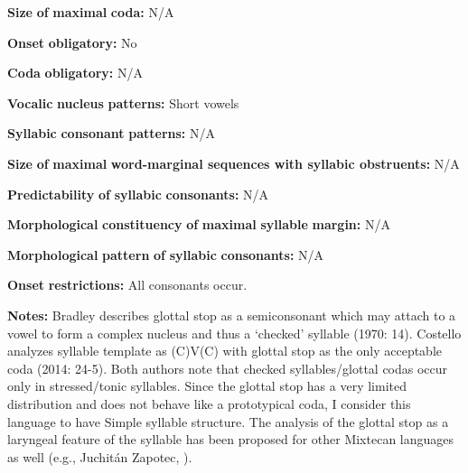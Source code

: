 \begin{styleBody}
\textbf{Size} \textbf{of} \textbf{maximal} \textbf{coda:} N/A
\end{styleBody}

\begin{styleBody}
\textbf{Onset} \textbf{obligatory:} No
\end{styleBody}

\begin{styleBody}
\textbf{Coda} \textbf{obligatory:} N/A
\end{styleBody}

\begin{styleBody}
\textbf{Vocalic} \textbf{nucleus} \textbf{patterns:} Short vowels
\end{styleBody}

\begin{styleBody}
\textbf{Syllabic} \textbf{consonant} \textbf{patterns:} N/A
\end{styleBody}

\begin{styleBody}
\textbf{Size} \textbf{of} \textbf{maximal} \textbf{word{}-marginal sequences with syllabic obstruents:} N/A
\end{styleBody}

\begin{styleBody}
\textbf{Predictability} \textbf{of} \textbf{syllabic} \textbf{consonants:} N/A
\end{styleBody}

\begin{styleBody}
\textbf{Morphological} \textbf{constituency} \textbf{of} \textbf{maximal} \textbf{syllable} \textbf{margin:} N/A
\end{styleBody}

\begin{styleBody}
\textbf{Morphological} \textbf{pattern} \textbf{of} \textbf{syllabic} \textbf{consonants:} N/A
\end{styleBody}

\begin{styleBody}
\textbf{Onset} \textbf{restrictions:} All consonants occur.
\end{styleBody}

\begin{styleBody}
\textbf{Notes:} Bradley describes glottal stop as a semiconsonant which may attach to a vowel to form a complex nucleus and thus a ‘checked’ syllable (1970: 14). Costello analyzes syllable template as (C)V(C) with glottal stop as the only acceptable coda (2014: 24-5). Both authors note that checked syllables/glottal codas occur only in stressed/tonic syllables. Since the glottal stop has a very limited distribution and does not behave like a prototypical coda, I consider this language to have Simple syllable structure. The analysis of the glottal stop as a laryngeal feature of the syllable has been proposed for other Mixtecan languages as well (e.g., Juchitán Zapotec, \citealt{MarlettPickett1987}).
\end{styleBody}


